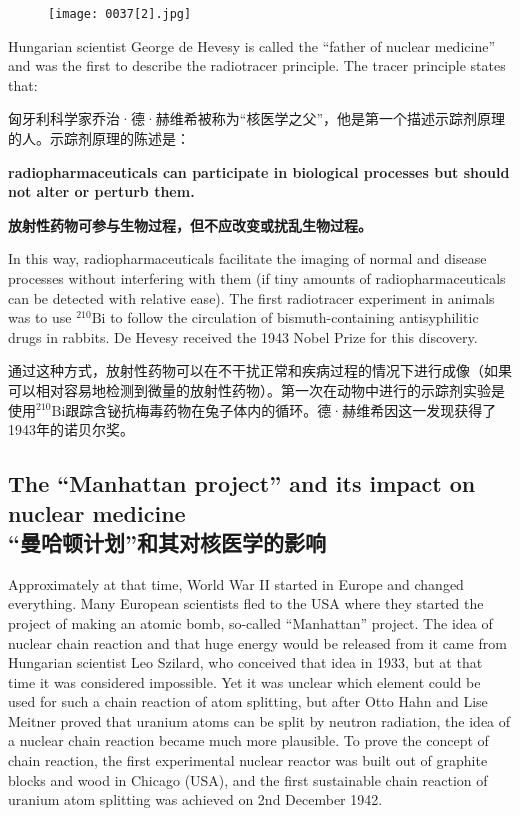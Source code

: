 \documentclass[dvipsnames, svgnames,a4paper,11pt]{article}
\begin{document}
\begin{figure}[htbp]
      \centering
      \texttt{[image: 0037[2].jpg]}
       \label{fig28}
\end{figure}

Hungarian scientist George de Hevesy is called the “father of nuclear medicine” and was the first to describe the radiotracer principle. The tracer principle states that:

匈牙利科学家乔治·德·赫维希被称为“核医学之父”，他是第一个描述示踪剂原理的人。示踪剂原理的陈述是：

\textbf{radiopharmaceuticals can participate in biological processes but should not alter or perturb them.}

\textbf{放射性药物可参与生物过程，但不应改变或扰乱生物过程。}

In this way, radiopharmaceuticals facilitate the imaging of normal and disease processes without interfering with them (if tiny amounts of radiopharmaceuticals can be detected with relative ease). The first radiotracer experiment in animals was to use ${}^\text{210}\text{Bi}$ to follow the circulation of bismuth-containing antisyphilitic drugs in rabbits. De Hevesy received the 1943 Nobel Prize for this discovery.

通过这种方式，放射性药物可以在不干扰正常和疾病过程的情况下进行成像（如果可以相对容易地检测到微量的放射性药物）。第一次在动物中进行的示踪剂实验是使用${}^\text{210}\text{Bi}$跟踪含铋抗梅毒药物在兔子体内的循环。德·赫维希因这一发现获得了1943年的诺贝尔奖。

\subsection{The “Manhattan project” and its impact on nuclear medicine\\“曼哈顿计划”和其对核医学的影响}

Approximately at that time, World War II started in Europe and changed everything. Many European scientists fled to the USA where they started the project of making an atomic bomb, so-called “Manhattan” project. The idea of nuclear chain reaction and that huge energy would be released from it came from Hungarian scientist Leo Szilard, who conceived that idea in 1933, but at that time it was considered impossible. Yet it was unclear which element could be used for such a chain reaction of atom splitting, but after Otto Hahn and Lise Meitner proved that uranium atoms can be split by neutron radiation, the idea of a nuclear chain reaction became much more plausible. To prove the concept of chain reaction, the first experimental nuclear reactor was built out of graphite blocks and wood in Chicago (USA), and the first sustainable chain reaction of uranium atom splitting was achieved on 2nd December 1942.
\end{document}
